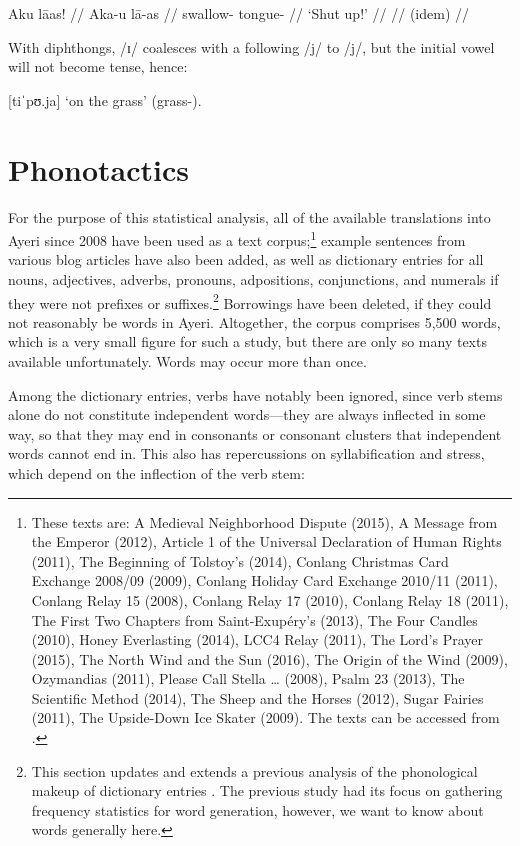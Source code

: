 \pex
	\a\begingl
		\gla Aku lāas! //
		\glb Aka-u lā-as //
		\glc swallow-\Imp{} tongue-\Parg{} //
		\glft `Shut up!' //
	\endgl
	\a\begingl
		 //
		\glb (idem) //
	\endgl
\xe

\noindent With diphthongs, /ɪ/ coalesces with a following /j/ to /j/, but the 
initial vowel will not become tense, hence:

\ex
	 [tiˈpʊ.ja] `on the grass' (grass-\Loc{}).
\xe

\section{Phonotactics}

For the purpose of this statistical analysis, all of the available translations 
into Ayeri since 2008 have been used as a text corpus;\footnote{These texts are:
A Medieval Neighborhood Dispute (2015),
A Message from the Emperor (2012),
Article 1 of the Universal Declaration of Human Rights (2011),
The Beginning of Tolstoy's  (2014),
Conlang Christmas Card Exchange 2008/09 (2009),
Conlang Holiday Card Exchange 2010/11 (2011),
Conlang Relay 15 (2008),
Conlang Relay 17 (2010),
Conlang Relay 18 (2011),
The First Two Chapters from Saint-Exupéry's  (2013),
The Four Candles (2010),
Honey Everlasting (2014),
LCC4 Relay (2011),
The Lord's Prayer (2015),
The North Wind and the Sun (2016),
The Origin of the Wind (2009),
Ozymandias (2011),
Please Call Stella … (2008),
Psalm 23 (2013),
The Scientific Method (2014),
The Sheep and the Horses (2012),
Sugar Fairies (2011),
The Upside-Down Ice Skater (2009).
The texts can be accessed from \citet[Examples]{benung}.
} example sentences from 
various blog articles have also been added, as well as dictionary entries for 
all nouns, adjectives, adverbs, pronouns, adpositions, conjunctions, and 
numerals if they were not prefixes or suffixes.\footnote{This section updates 
and extends a previous analysis of the phonological makeup of dictionary entries 
\autocite{becker:frequency}. The previous study had its focus on gathering 
frequency statistics for word generation, however, we want to know about words 
generally here.} Borrowings have been deleted, if they could not reasonably be 
words in Ayeri. Altogether, the corpus comprises 5,500 words, which is a very 
small figure for such a study, but there are only so many texts available 
unfortunately. Words may occur more than once.

Among the dictionary entries, verbs have notably been ignored, since verb stems 
alone do not constitute independent words---they are always inflected in some 
way, so that they may end in consonants or consonant clusters that independent 
words cannot end in. This also has repercussions on syllabification and stress, 
which depend on the inflection of the verb stem:

